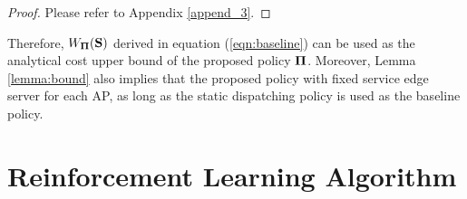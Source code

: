 \begin{proof}
    Please refer to Appendix \ref{append_3}.
\end{proof}
Therefore, $W_{\boldsymbol{\Pi}}(\mathbf{S})$ derived in equation (\ref{eqn:baseline}) can be used as the analytical cost upper bound of the proposed policy $\boldsymbol{\Pi}$.
Moreover, Lemma \ref{lemma:bound} also implies that the proposed policy with fixed service edge server for each AP, as long as the {static dispatching policy} is used as the baseline policy.

\section{Reinforcement Learning Algorithm}
\label{sec:rl-alg}
